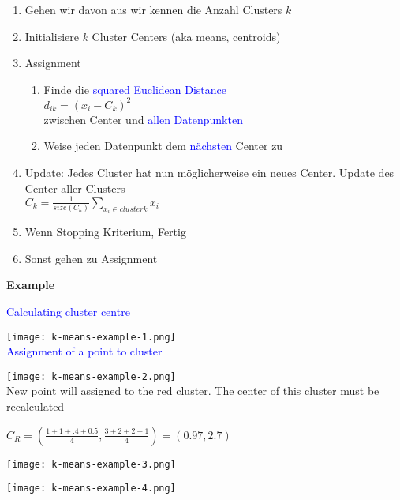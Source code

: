 \begin{enumerate}
    \item Gehen wir davon aus wir kennen die Anzahl Clusters $k$
    \item Initialisiere $k$ Cluster Centers (aka means, centroids)
    \item Assignment
        \begin{enumerate}
            \item Finde die \textcolor{blue}{squared Euclidean Distance} \\ $d_{ik} = (x_i - C_k)^2$ \\ zwischen Center und \textcolor{blue}{allen Datenpunkten}
            \item Weise jeden Datenpunkt dem \textcolor{blue}{nächsten} Center zu
        \end{enumerate}
    \item Update: Jedes Cluster hat nun möglicherweise ein neues Center. Update des Center aller Clusters \\ $C_k = \frac{1}{size(C_k)} \sum_{x_i \in cluster k} x_i$
    \item Wenn Stopping Kriterium, Fertig
    \item Sonst gehen zu Assignment
\end{enumerate}
\vspace{10pt}

\textbf{Example}

\textcolor{blue}{Calculating cluster centre}

\texttt{[image: k-means-example-1.png]} \\

\textcolor{blue}{Assignment of a point to cluster}

\texttt{[image: k-means-example-2.png]} \\

New point will assigned to the red cluster. The center of this cluster must be recalculated

$C_R = (\frac{1+1+.4+0.5}{4} , \frac{3+2+2+1}{4}) = (0.97, 2.7)$ \\

\begin{minipage}[t]{0.5\linewidth}
    \texttt{[image: k-means-example-3.png]}
\end{minipage}
\begin{minipage}[t]{0.5\linewidth}
    \texttt{[image: k-means-example-4.png]}
\end{minipage}


